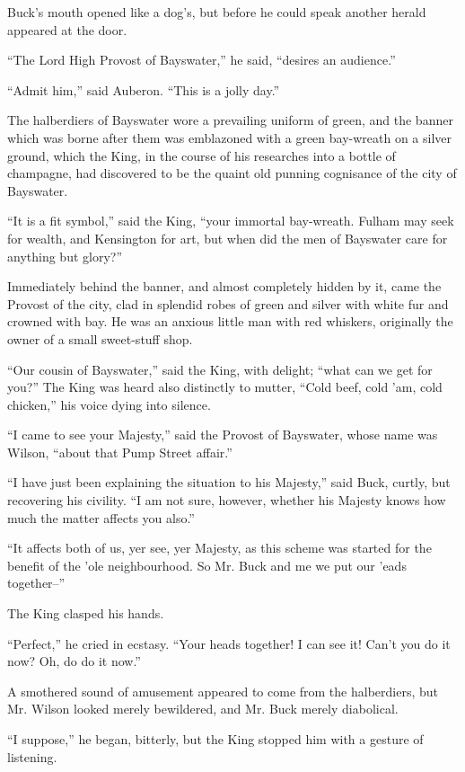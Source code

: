 \documentclass{book}
\begin{document}
Buck’s mouth opened like a dog’s, but before he could speak another herald appeared at the door.

“The Lord High Provost of Bayswater,” he said, “desires an audience.”

“Admit him,” said Auberon. “This is a jolly day.”

The halberdiers of Bayswater wore a prevailing uniform of green, and the banner which was borne after them was emblazoned with a green bay-wreath on a silver ground, which the King, in the course of his researches into a bottle of champagne, had discovered to be the quaint old punning cognisance of the city of Bayswater.

“It is a fit symbol,” said the King, “your immortal bay-wreath. Fulham may seek for wealth, and Kensington for art, but when did the men of Bayswater care for anything but glory?”

Immediately behind the banner, and almost completely hidden by it, came the Provost of the city, clad in splendid robes of green and silver with white fur and crowned with bay. He was an anxious little man with red whiskers, originally the owner of a small sweet-stuff shop.

“Our cousin of Bayswater,” said the King, with delight; “what can we get for you?” The King was heard also distinctly to mutter, “Cold beef, cold ’am, cold chicken,” his voice dying into silence.

“I came to see your Majesty,” said the Provost of Bayswater, whose name was Wilson, “about that Pump Street affair.”

“I have just been explaining the situation to his Majesty,” said Buck, curtly, but recovering his civility. “I am not sure, however, whether his Majesty knows how much the matter affects you also.”

“It affects both of us, yer see, yer Majesty, as this scheme was started for the benefit of the ’ole neighbourhood. So Mr. Buck and me we put our ’eads together–”

The King clasped his hands.

“Perfect,” he cried in ecstasy. “Your heads together! I can see it! Can’t you do it now? Oh, do do it now.”

A smothered sound of amusement appeared to come from the halberdiers, but Mr. Wilson looked merely bewildered, and Mr. Buck merely diabolical.

“I suppose,” he began, bitterly, but the King stopped him with a gesture of listening.
\end{document}
